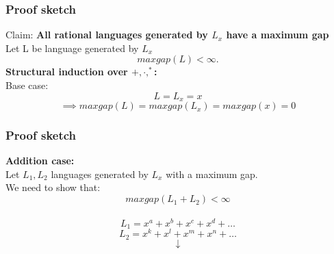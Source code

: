 \documentclass{beamer}
\begin{document}
\begin{frame}
  \frametitle{Proof sketch}
  Claim: {\bf
    All rational languages generated by $L_x$ have a
    maximum gap
  }\\
  Let L be language generated by $L_x$
  \[ maxgap(L) < \infty. \]
  {\bf Structural induction over $+, \cdot, ^*$:}\\
  \vspace{1cm}
  Base case: \\
  \[L = L_x = x\]
  \[ \implies maxgap(L) = maxgap(L_x) = maxgap(x) = 0\]
\end{frame}
\begin{frame}
  \frametitle{Proof sketch}
  {\bf Addition case:}\\
  Let $L_1,L_2$ languages generated by $L_x$ with a maximum gap.\\
  We need to show that: 
  \[ maxgap(L_1+L_2) < \infty \]\\
  \[ L_1 = x^a + x^b + x^c + x^d + \dots  \]
  \[ L_2 = x^k + x^l + x^m + x^n + \dots  \]
  \vspace{0.05cm}
  \[ \downarrow \]
  \vspace{0.05cm}
  \begin{center}
  \end{center}
\end{frame}
\end{document}
